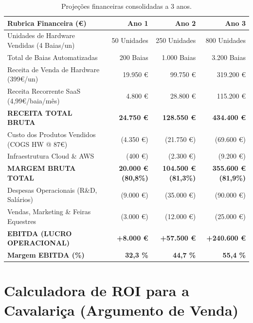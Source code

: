 \documentclass[11pt,a4paper]{article}
\begin{document}
\begin{table}[h!]
\centering
\small
\renewcommand{\arraystretch}{1.3}
\begin{tabularx}{\textwidth}{X r r r}
\hline
\rowcolor{primary!10} \textbf{Rubrica Financeira (€)} & \textbf{Ano 1} & \textbf{Ano 2} & \textbf{Ano 3} \\ \hline
Unidades de Hardware Vendidas (4 Baias/un) & 50 Unidades & 250 Unidades & 800 Unidades \\
Total de Baias Automatizadas & 200 Baias & 1.000 Baias & 3.200 Baias \\ \hline
Receita de Venda de Hardware (399€/un) & 19.950 € & 99.750 € & 319.200 € \\
Receita Recorrente SaaS (4,99€/baia/mês) & 4.800 € & 28.800 € & 115.200 € \\ \hline
\textbf{RECEITA TOTAL BRUTA} & \textbf{24.750 €} & \textbf{128.550 €} & \textbf{434.400 €} \\ \hline
Custo dos Produtos Vendidos (COGS HW @ 87€) & (4.350 €) & (21.750 €) & (69.600 €) \\
Infraestrutura Cloud \& AWS & (400 €) & (2.300 €) & (9.200 €) \\ \hline
\textbf{MARGEM BRUTA TOTAL} & \textbf{20.000 € (80,8\%)} & \textbf{104.500 € (81,3\%)} & \textbf{355.600 € (81,9\%)} \\ \hline
Despesas Operacionais (R\&D, Salários) & (9.000 €) & (35.000 €) & (90.000 €) \\
Vendas, Marketing \& Feiras Equestres & (3.000 €) & (12.000 €) & (25.000 €) \\ \hline
\textbf{EBITDA (LUCRO OPERACIONAL)} & \textbf{+8.000 €} & \textbf{+57.500 €} & \textbf{+240.600 €} \\
\textbf{Margem EBITDA (\%)} & \textbf{32,3 \%} & \textbf{44,7 \%} & \textbf{55,4 \%} \\ \hline
\end{tabularx}
\caption{Projeções financeiras consolidadas a 3 anos.}
\end{table}

\section{Calculadora de ROI para a Cavalariça (Argumento de Venda)}
\end{document}
